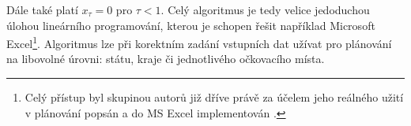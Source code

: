 %


Dále také platí $x_{\tau}=0$ pro $\tau<1$.
Celý algoritmus je tedy velice jedoduchou úlohou lineárního programování, kterou je schopen řešit například Microsoft Excel\footnote{Celý přístup byl skupinou autorů již dříve právě za účelem jeho reálného užití v plánování popsán a do MS Excel implementován \cite{calc_blog}.}. Algoritmus lze při korektním zadání vstupních dat užívat pro plánování na libovolné úrovni: státu, kraje či jednotlivého očkovacího místa. 
%

